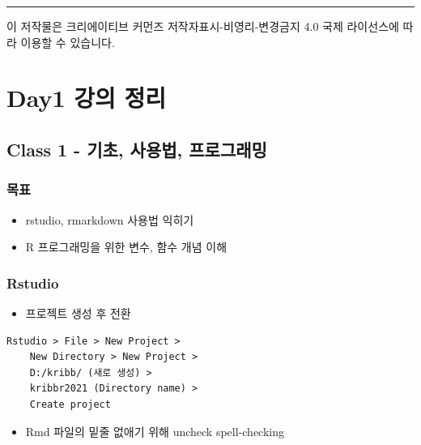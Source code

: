 \documentclass[
]{book}
\providecommand{\tightlist}{%
  \setlength{\itemsep}{0pt}\setlength{\parskip}{0pt}}
\begin{document}
\begin{center}\rule{0.5\linewidth}{0.5pt}\end{center}

이 저작물은 크리에이티브 커먼즈 저작자표시-비영리-변경금지 4.0 국제 라이선스에 따라 이용할 수 있습니다.

\hypertarget{day1-uxac15uxc758-uxc815uxb9ac}{%
\chapter{Day1 강의 정리}\label{day1-uxac15uxc758-uxc815uxb9ac}}

\hypertarget{class-1---uxae30uxcd08-uxc0acuxc6a9uxbc95-uxd504uxb85cuxadf8uxb798uxbc0d}{%
\section{Class 1 - 기초, 사용법, 프로그래밍}\label{class-1---uxae30uxcd08-uxc0acuxc6a9uxbc95-uxd504uxb85cuxadf8uxb798uxbc0d}}

\hypertarget{uxbaa9uxd45c}{%
\subsection{목표}\label{uxbaa9uxd45c}}

\begin{itemize}
\tightlist
\item
  rstudio, rmarkdown 사용법 익히기
\item
  R 프로그래밍을 위한 변수, 함수 개념 이해
\end{itemize}

\hypertarget{rstudio}{%
\subsection{Rstudio}\label{rstudio}}

\begin{itemize}
\tightlist
\item
  프로젝트 생성 후 전환
\end{itemize}

\begin{verbatim}
Rstudio > File > New Project > 
    New Directory > New Project >
    D:/kribb/ (새로 생성) > 
    kribbr2021 (Directory name) >
    Create project
\end{verbatim}

\begin{itemize}
\tightlist
\item
  Rmd 파일의 밑줄 없애기 위해 uncheck spell-checking
\end{itemize}
\end{document}
